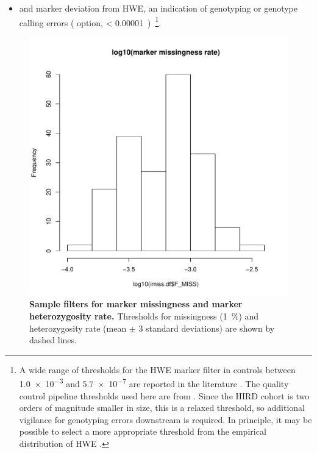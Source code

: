 \begin{itemize}
    \item and marker deviation from \gls{HWE}, an indication of genotyping or genotype calling errors \autocite{mccarthy2008GenomewideAssociationStudies,anderson2010DataQualityControl} ( option, \pvalue{} \SI[scientific-notation=true]{< 0.00001})%
        \footnote{
            A wide range of thresholds for the \gls{HWE} marker filter in controls between \num{1.0e-3} and \num{5.7e-7} are reported in the literature \autocite{anderson2010DataQualityControl}.
            The quality control pipeline thresholds used here are from \textcite{delange2017GenomewideAssociationStudy}. 
            Since the \gls{HIRD} cohort is two orders of magnitude smaller in size, this is a relaxed threshold, so additional vigilance for genotyping errors downstream is required.
            In principle, it may be possible to select a more appropriate threshold from the empirical distribution of \gls{HWE} \pvalues{} \autocite{mccarthy2008GenomewideAssociationStudies}.
        }.
\end{itemize}

\begin{figure}
    \includegraphics[width=1.0\textwidth,page=2]{mainmatter/figures/chapter_02/coreex_eQTLflu_20171204.gencall.smajor.impute_sex.qc2.pdf}
    \caption{
        \textbf{Sample filters for marker missingness and marker heterozygosity rate.}
        Thresholds for missingness (\SI{1}{\percent}) and heterozygosity rate (mean $\pm$ 3 standard deviations) are shown by dashed lines.
    }
    \label{fig:hird_genotype_sample_hetRate_missingness}
\end{figure}

